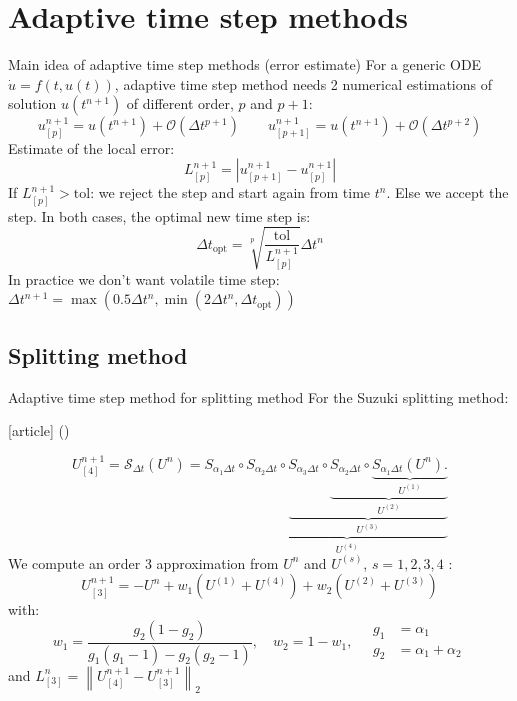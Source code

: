 \documentclass{beamer}
\newcommand{\customcite}[1]{\citeauthor{#1} (\citeyear{#1})}
\begin{document}
\section{Adaptive time step methods}
\begin{frame}{Main idea of adaptive time step methods (error estimate)}
  For a generic ODE $\dot{u} = f(t,u(t))$, adaptive time step method needs 2 numerical estimations of solution $u(t^{n+1})$ of different order, $p$ and $p+1$:
  $$
    u^{n+1}_{[p]} = u(t^{n+1}) + \mathcal{O}\left(\Delta t^{p+1}\right)
    \qquad
    u^{n+1}_{[p+1]} = u(t^{n+1}) + \mathcal{O}\left(\Delta t^{p+2}\right)
  $$
  Estimate of the local error:
  $$
    L^{n+1}_{[p]} = \left| u^{n+1}_{[p+1]} - u^{n+1}_{[p]} \right|
  $$
  If $L^{n+1}_{[p]} > \text{tol}$: we reject the step and  start again from time $t^n$. Else we accept the step. In both cases, the optimal new time step is:
  $$
    \Delta t_\text{opt} = \sqrt[p]{\frac{\text{tol}}{ L^{n+1}_{[p]}}}\Delta t^n
  $$
  In practice we don't want volatile time step: $\Delta t^{n+1} = \max\left(0.5\Delta t^n,\min\left(2\Delta t^n,\Delta t_\text{opt}\right)\right)$
\end{frame}

\subsection{Splitting method}
\begin{frame}{Adaptive time step method for splitting method}
  For the Suzuki splitting method:
  \begin{thebibliography}{9}
    [article]
     \customcite{Blanes:2019}
  \end{thebibliography}
  $$
    U^{n+1}_{[4]} = \mathcal{S}_{\Delta t}(U^n)
      = S_{\alpha_1\Delta t}
        \circ \underbrace{ S_{\alpha_2\Delta t}
        \circ \underbrace{ S_{\alpha_3\Delta t}
        \circ \underbrace{ S_{\alpha_2\Delta t}
        \circ \underbrace{ S_{\alpha_1\Delta t} (U^n). }_{U^{(1)}}
                                                      }_{U^{(2)}}
                                                      }_{U^{(3)}}
                                                      }_{U^{(4)}}
  $$
  We compute an order 3 approximation from $U^n$ and $U^{(s)}$, $s=1,2,3,4$ :
  $$
    U^{n+1}_{[3]} = -U^n + w_1(U^{(1)}+U^{(4)}) + w_2(U^{(2)}+U^{(3)})
  $$
  with:
  $$
    w_1 = \frac{g_2(1-g_2)}{g_1(g_1-1)-g_2(g_2-1)},\quad w_2 = 1-w_1, \quad \begin{aligned}g_1 &= \alpha_1\\ g_2&=\alpha_1+\alpha_2\end{aligned}
  $$
  and $L^{n}_{[3]} = \left\| U^{n+1}_{[4]} - U^{n+1}_{[3]} \right\|_2$
\end{frame}
\end{document}

